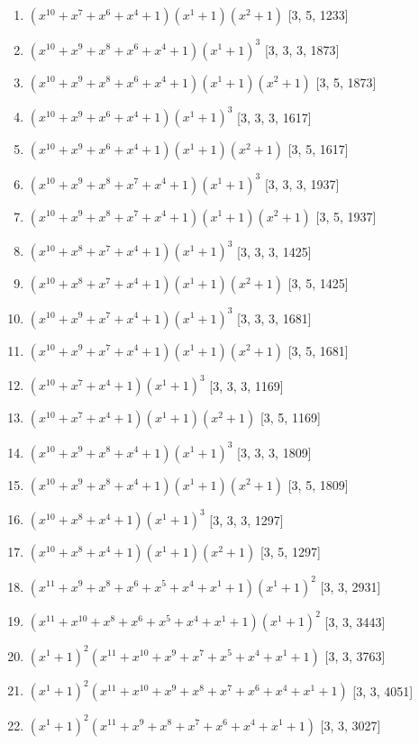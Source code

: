 \documentclass[10pt,twocolumn]{article}
\begin{document}
\begin{enumerate}
\item $(x^{10} + x^{7} + x^{6} + x^{4} + 1)(x^{1} + 1)(x^{2} + 1)$  [3, 5, 1233]
\item $(x^{10} + x^{9} + x^{8} + x^{6} + x^{4} + 1)(x^{1} + 1)^{3}$  [3, 3, 3, 1873]
\item $(x^{10} + x^{9} + x^{8} + x^{6} + x^{4} + 1)(x^{1} + 1)(x^{2} + 1)$  [3, 5, 1873]
\item $(x^{10} + x^{9} + x^{6} + x^{4} + 1)(x^{1} + 1)^{3}$  [3, 3, 3, 1617]
\item $(x^{10} + x^{9} + x^{6} + x^{4} + 1)(x^{1} + 1)(x^{2} + 1)$  [3, 5, 1617]
\item $(x^{10} + x^{9} + x^{8} + x^{7} + x^{4} + 1)(x^{1} + 1)^{3}$  [3, 3, 3, 1937]
\item $(x^{10} + x^{9} + x^{8} + x^{7} + x^{4} + 1)(x^{1} + 1)(x^{2} + 1)$  [3, 5, 1937]
\item $(x^{10} + x^{8} + x^{7} + x^{4} + 1)(x^{1} + 1)^{3}$  [3, 3, 3, 1425]
\item $(x^{10} + x^{8} + x^{7} + x^{4} + 1)(x^{1} + 1)(x^{2} + 1)$  [3, 5, 1425]
\item $(x^{10} + x^{9} + x^{7} + x^{4} + 1)(x^{1} + 1)^{3}$  [3, 3, 3, 1681]
\item $(x^{10} + x^{9} + x^{7} + x^{4} + 1)(x^{1} + 1)(x^{2} + 1)$  [3, 5, 1681]
\item $(x^{10} + x^{7} + x^{4} + 1)(x^{1} + 1)^{3}$  [3, 3, 3, 1169]
\item $(x^{10} + x^{7} + x^{4} + 1)(x^{1} + 1)(x^{2} + 1)$  [3, 5, 1169]
\item $(x^{10} + x^{9} + x^{8} + x^{4} + 1)(x^{1} + 1)^{3}$  [3, 3, 3, 1809]
\item $(x^{10} + x^{9} + x^{8} + x^{4} + 1)(x^{1} + 1)(x^{2} + 1)$  [3, 5, 1809]
\item $(x^{10} + x^{8} + x^{4} + 1)(x^{1} + 1)^{3}$  [3, 3, 3, 1297]
\item $(x^{10} + x^{8} + x^{4} + 1)(x^{1} + 1)(x^{2} + 1)$  [3, 5, 1297]
\item $(x^{11} + x^{9} + x^{8} + x^{6} + x^{5} + x^{4} + x^{1} + 1)(x^{1} + 1)^{2}$  [3, 3, 2931]
\item $(x^{11} + x^{10} + x^{8} + x^{6} + x^{5} + x^{4} + x^{1} + 1)(x^{1} + 1)^{2}$  [3, 3, 3443]
\item $(x^{1} + 1)^{2}(x^{11} + x^{10} + x^{9} + x^{7} + x^{5} + x^{4} + x^{1} + 1)$  [3, 3, 3763]
\item $(x^{1} + 1)^{2}(x^{11} + x^{10} + x^{9} + x^{8} + x^{7} + x^{6} + x^{4} + x^{1} + 1)$  [3, 3, 4051]
\item $(x^{1} + 1)^{2}(x^{11} + x^{9} + x^{8} + x^{7} + x^{6} + x^{4} + x^{1} + 1)$  [3, 3, 3027]

\end{enumerate}
\end{document}

